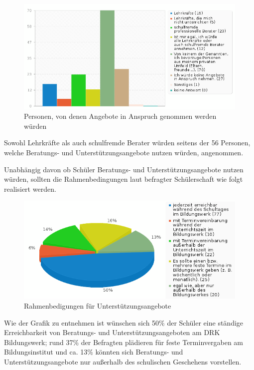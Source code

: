 \begin{figure}[h]
	\centering
		\includegraphics[width=1.0\textwidth]{images/Von-welchen-Personen-wuerden-unterstuetzende-Angebote-angenommen.png}
	\caption{Personen, von denen Angebote in Anspruch genommen werden würden}
	\label{fig:Von-welchen-Personen-wuerden-unterstuetzende-Angebote-angenommen}
\end{figure}

Sowohl Lehrkräfte als auch schulfremde Berater würden seitens der 56 Personen, welche Beratungs- und Unterstützungsangebote nutzen würden, angenommen. 

Unabhängig davon ob Schüler Beratungs- und Unterstützungsangebote nutzen würden, sollten die Rahmenbedingungen laut befragter Schülerschaft wie folgt realisiert werden. 

\begin{figure}[h]
	\centering
		\includegraphics[width=1.0\textwidth]{images/Rahmenbedingungen-fuer-Unterstuetzungangebote.png}
	\caption{Rahmenbedigungen für Unterstützungsangebote}
	\label{fig:Rahmenbedingungen-fuer-Unterstuetzungangebote}
\end{figure}

\noindent
Wie der Grafik zu entnehmen ist wünschen sich 50\% der Schüler eine ständige Erreichbarkeit von Beratungs- und Unterstützungsangeboten am DRK Bildungswerk; rund 37\% der Befragten plädieren für feste Terminvergaben am Bildungsinstitut und ca. 13\% könnten sich Beratungs- und Unterstützungsangebote nur außerhalb des schulischen Geschehens vorstellen.\\

